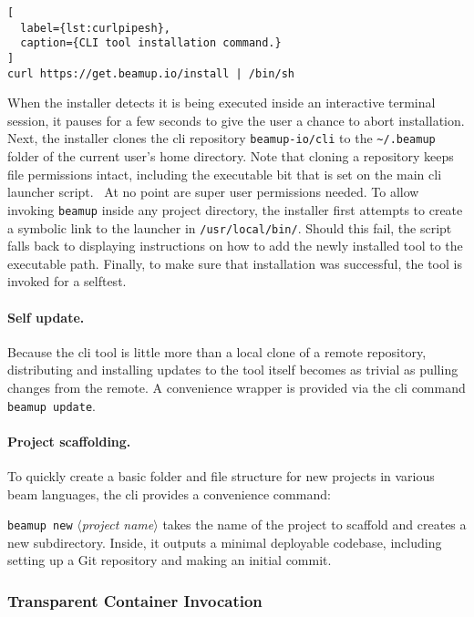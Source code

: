 \begin{lstlisting}[
  label={lst:curlpipesh},
  caption={CLI tool installation command.}
]
curl https://get.beamup.io/install | /bin/sh
\end{lstlisting}

When the installer detects it is being executed inside an interactive terminal session, it pauses for a few seconds to give the user a chance to abort installation. Next, the installer clones the \acrshort{cli} repository \lstinline|beamup-io/cli| to the \lstinline|~/.beamup| folder of the current user's home directory. Note that cloning a repository keeps file permissions intact, including the executable bit that is set on the main \acrshort{cli} launcher script.~\cite{sink2011version} At no point are super user permissions needed. To allow invoking \lstinline|beamup| inside any project directory, the installer first attempts to create a symbolic link to the launcher in \lstinline|/usr/local/bin/|. Should this fail, the script falls back to displaying instructions on how to add the newly installed tool to the executable path. Finally, to make sure that installation was successful, the tool is invoked for a selftest.

\paragraph{Self update.} Because the \acrshort{cli} tool is little more than a local clone of a remote repository, distributing and installing updates to the tool itself becomes as trivial as pulling changes from the remote. A convenience wrapper is provided via the \acrshort{cli} command \lstinline|beamup update|.

\paragraph{Project scaffolding.} To quickly create a basic folder and file structure for new projects in various \acrshort{beam} languages, the \acrshort{cli} provides a convenience command:

\lstinline|beamup new| $\langle$\emph{project name}$\rangle$ takes the name of the project to scaffold and creates a new subdirectory. Inside, it outputs a minimal deployable codebase, including setting up a Git repository and making an initial commit.

\subsubsection{Transparent Container Invocation}

